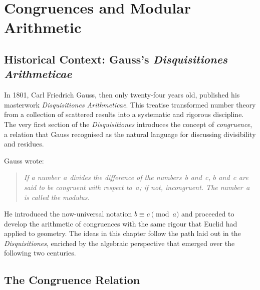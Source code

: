 \documentclass[12pt,a4paper,openany]{book}
\theoremstyle{definition}
\theoremstyle{plain}
\theoremstyle{remark}
\begin{document}


\chapter{Congruences and Modular Arithmetic}
\label{ch:congruences}

\section{Historical Context: Gauss's \textit{Disquisitiones Arithmeticae}}
\label{sec:gauss-disquisitiones}

In 1801, Carl Friedrich Gauss, then only twenty-four years old, published
his masterwork \textit{Disquisitiones Arithmeticae}.
This treatise transformed number theory from a collection of scattered
results into a systematic and rigorous discipline.  The very first section
of the \textit{Disquisitiones} introduces the concept of \emph{congruence},
a relation that Gauss recognised as the natural language for discussing
divisibility and residues.

Gauss wrote:
\begin{quote}
\itshape
If a number~$a$ divides the difference of the numbers~$b$ and~$c$,
$b$ and~$c$ are said to be \emph{congruent} with respect to~$a$;
if not, \emph{incongruent}.  The number~$a$ is called the \emph{modulus}.
\end{quote}

\noindent
He introduced the now-universal notation $b \equiv c \pmod{a}$ and
proceeded to develop the arithmetic of congruences with the same
rigour that Euclid had applied to geometry.  The ideas in this chapter
follow the path laid out in the \textit{Disquisitiones}, enriched by
the algebraic perspective that emerged over the following two centuries.

\section{The Congruence Relation}
\label{sec:congruence-def}
\end{document}
